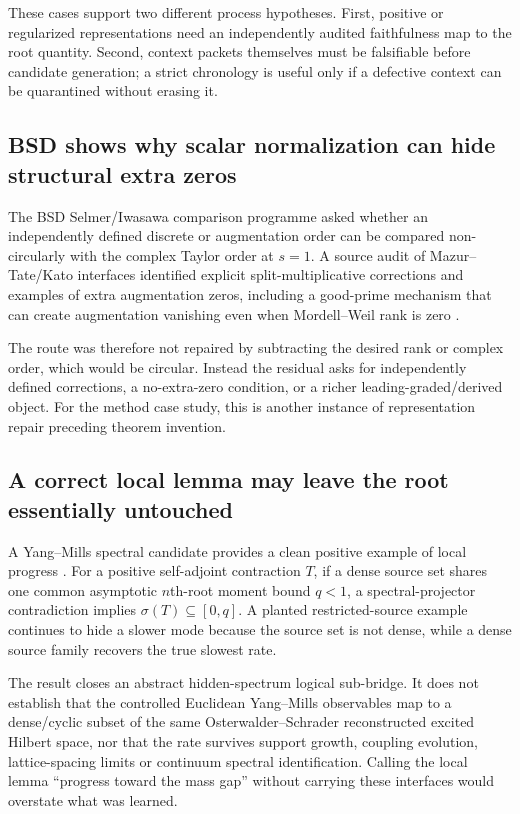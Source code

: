 These cases support two different process hypotheses. First, positive or regularized representations need an independently audited faithfulness map to the root quantity. Second, context packets themselves must be falsifiable before candidate generation; a strict chronology is useful only if a defective context can be quarantined without erasing it.

\subsection{BSD shows why scalar normalization can hide structural extra zeros}

The BSD Selmer/Iwasawa comparison programme asked whether an independently defined discrete or augmentation order can be compared non-circularly with the complex Taylor order at $s=1$. A source audit of Mazur--Tate/Kato interfaces identified explicit split-multiplicative corrections and examples of extra augmentation zeros, including a good-prime mechanism that can create augmentation vanishing even when Mordell--Weil rank is zero \cite{raklmath_bsd_s001c1a,ota2015mazurtate}.

The route was therefore not repaired by subtracting the desired rank or complex order, which would be circular. Instead the residual asks for independently defined corrections, a no-extra-zero condition, or a richer leading-graded/derived object. For the method case study, this is another instance of representation repair preceding theorem invention.

\subsection{A correct local lemma may leave the root essentially untouched}

A Yang--Mills spectral candidate provides a clean positive example of local progress \cite{raklmath_ym_s1a1}. For a positive self-adjoint contraction $T$, if a dense source set shares one common asymptotic $n$th-root moment bound $q<1$, a spectral-projector contradiction implies $\sigma(T)\subseteq[0,q]$. A planted restricted-source example continues to hide a slower mode because the source set is not dense, while a dense source family recovers the true slowest rate.

The result closes an abstract hidden-spectrum logical sub-bridge. It does not establish that the controlled Euclidean Yang--Mills observables map to a dense/cyclic subset of the same Osterwalder--Schrader reconstructed excited Hilbert space, nor that the rate survives support growth, coupling evolution, lattice-spacing limits or continuum spectral identification. Calling the local lemma ``progress toward the mass gap'' without carrying these interfaces would overstate what was learned.

